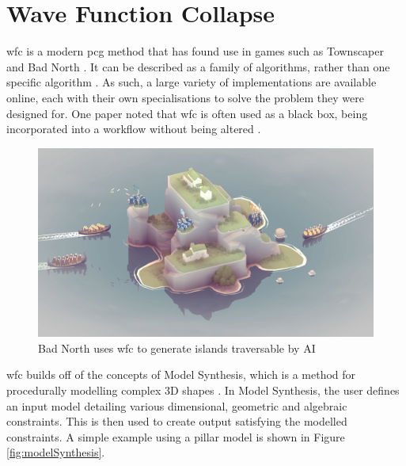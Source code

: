 
\section{Wave Function Collapse}
\acrfull{wfc} \cite{Gumin_Wave_Function_Collapse_2016} is a modern \acrshort{pcg} method that has found use in games such as Townscaper \cite{townscaper} and Bad North \cite{badnorth}. It can be described as a family of algorithms, rather than one specific algorithm \cite{WFC_ConstraintSolving_and_ML}. As such, a large variety of implementations are available online, each with their own specialisations to solve the problem they were designed for. One paper noted that \acrlong{wfc} is often used as a black box, being incorporated into a workflow without being altered \cite{WFC_In_The_Wild}.

\begin{figure}[H]
    \centering
    \includegraphics[width=\textwidth, height=0.3\textheight, keepaspectratio]{Images/BadNorth.jpg}
    \caption{Bad North uses \acrshort{wfc} to generate islands traversable by AI \cite{badnorth}}
    \label{fig:badNorth}
\end{figure}

\acrlong{wfc} builds off of the concepts of Model Synthesis, which is a method for procedurally modelling complex 3D shapes \cite{model_synthesis, model_synthesis_diss}. In Model Synthesis, the user defines an input model detailing various dimensional, geometric and algebraic constraints. This is then used to create output satisfying the modelled constraints. A simple example using a pillar model is shown in Figure \ref{fig:modelSynthesis}.

